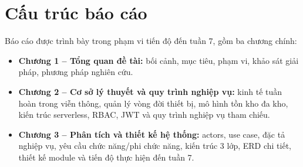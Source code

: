 \section{Cấu trúc báo cáo}
Báo cáo được trình bày trong phạm vi tiến độ đến tuần 7, gồm ba chương chính:
\begin{itemize}[leftmargin=1.2cm]
    \item \textbf{Chương 1 -- Tổng quan đề tài:} bối cảnh, mục tiêu, phạm vi, khảo sát giải pháp, phương pháp nghiên cứu.
    \item \textbf{Chương 2 -- Cơ sở lý thuyết và quy trình nghiệp vụ:} kinh tế tuần hoàn trong viễn thông, quản lý vòng đời thiết bị, mô hình tồn kho đa kho, kiến trúc serverless, RBAC, JWT và quy trình nghiệp vụ tham chiếu.
    \item \textbf{Chương 3 -- Phân tích và thiết kế hệ thống:} actors, use case, đặc tả nghiệp vụ, yêu cầu chức năng/phi chức năng, kiến trúc 3 lớp, ERD chi tiết, thiết kế module và tiến độ thực hiện đến tuần 7.
\end{itemize}
